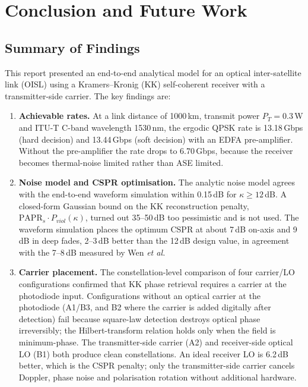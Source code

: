 \chapter{Conclusion and Future Work}

\section{Summary of Findings}

This report presented an end-to-end analytical model for an optical inter-satellite link (OISL) using a Kramers--Kronig (KK) self-coherent receiver with a transmitter-side carrier. The key findings are:

\begin{enumerate}
\item \textbf{Achievable rates.} At a link distance of 1000\,km, transmit power $P_T=0.3$\,W and ITU-T C-band wavelength 1530\,nm, the ergodic QPSK rate is 13.18\,Gbps (hard decision) and 13.44\,Gbps (soft decision) with an EDFA pre-amplifier. Without the pre-amplifier the rate drops to 6.70\,Gbps, because the receiver becomes thermal-noise limited rather than ASE limited.

\item \textbf{Noise model and CSPR optimisation.} The analytic noise model agrees with the end-to-end waveform simulation within 0.15\,dB for $\kappa\ge12$\,dB. A closed-form Gaussian bound on the KK reconstruction penalty, $\mathrm{PAPR}_s\cdot P_{viol}(\kappa)$, turned out 35--50\,dB too pessimistic and is not used. The waveform simulation places the optimum CSPR at about 7\,dB on-axis and 9\,dB in deep fades, 2--3\,dB better than the 12\,dB design value, in agreement with the 7--8\,dB measured by Wen \emph{et al.}

\item \textbf{Carrier placement.} The constellation-level comparison of four carrier/LO configurations confirmed that KK phase retrieval requires a carrier at the photodiode input. Configurations without an optical carrier at the photodiode (A1/B3, and B2 where the carrier is added digitally after detection) fail because square-law detection destroys optical phase irreversibly; the Hilbert-transform relation holds only when the field is minimum-phase. The transmitter-side carrier (A2) and receiver-side optical LO (B1) both produce clean constellations. An ideal receiver LO is 6.2\,dB better, which is the CSPR penalty; only the transmitter-side carrier cancels Doppler, phase noise and polarisation rotation without additional hardware.


\end{enumerate}
